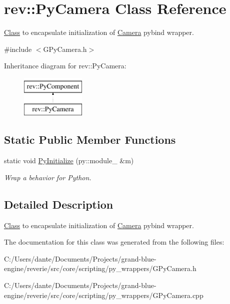 \hypertarget{classrev_1_1_py_camera}{}\section{rev\+::Py\+Camera Class Reference}
\label{classrev_1_1_py_camera}


\mbox{\hyperlink{struct_class}{Class}} to encapsulate initialization of \mbox{\hyperlink{classrev_1_1_camera}{Camera}} pybind wrapper.  




{\ttfamily \#include $<$G\+Py\+Camera.\+h$>$}

Inheritance diagram for rev\+::Py\+Camera\+:\begin{figure}[H]
\begin{center}
\leavevmode
\includegraphics[height=2.000000cm]{classrev_1_1_py_camera}
\end{center}
\end{figure}
\subsection*{Static Public Member Functions}
\begin{DoxyCompactItemize}
\item 
\mbox{\label{classrev_1_1_py_camera_ac81dcdf6d7f4cb7b5194f3ef64393ead}} 
static void \mbox{\hyperlink{classrev_1_1_py_camera_ac81dcdf6d7f4cb7b5194f3ef64393ead}{Py\+Initialize}} (py\+::module\+\_\+ \&m)
\begin{DoxyCompactList}\small\item\em Wrap a behavior for Python. \end{DoxyCompactList}\end{DoxyCompactItemize}


\subsection{Detailed Description}
\mbox{\hyperlink{struct_class}{Class}} to encapsulate initialization of \mbox{\hyperlink{classrev_1_1_camera}{Camera}} pybind wrapper. 

The documentation for this class was generated from the following files\+:\begin{DoxyCompactItemize}
\item 
C\+:/\+Users/dante/\+Documents/\+Projects/grand-\/blue-\/engine/reverie/src/core/scripting/py\+\_\+wrappers/G\+Py\+Camera.\+h\item 
C\+:/\+Users/dante/\+Documents/\+Projects/grand-\/blue-\/engine/reverie/src/core/scripting/py\+\_\+wrappers/G\+Py\+Camera.\+cpp\end{DoxyCompactItemize}

